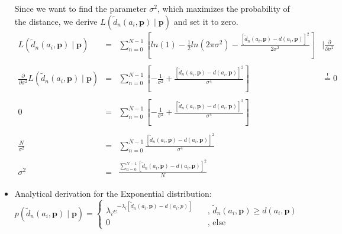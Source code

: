 \documentclass{article}
\begin{document}
\begin{itemize}
	    Since we want to find the parameter $\sigma^2$, which maximizes the probability of the distance, we derive $L(\tilde{d}_n(a_i,\mathbf{p})\mid\mathbf{p})$ and set it to zero. \\
	
	    $\begin{array}{cccr}
	        L(\tilde{d}_n(a_i,\mathbf{p})\mid\mathbf{p}) & = & \displaystyle \sum_{n=0}^{N-1} \left[ ln(1) - \frac{1}{2}ln(2\pi\sigma^2) - \frac{[\tilde{d}_n(a_i,\mathbf{p})-d(a_i,\mathbf{p})]^2}{2\sigma^2} \right] & \mid \frac{\partial}{\partial\sigma^2} \\\\
	        \frac{\partial}{\partial\sigma^2} L(\tilde{d}_n(a_i,\mathbf{p})\mid\mathbf{p}) & = & \displaystyle \sum_{n=0}^{N-1} \left[ - \frac{1}{\sigma^2} + \frac{[\tilde{d}_n(a_i,\mathbf{p})-d(a_i,\mathbf{p})]^2}{\sigma^4} \right] & \stackrel{!}{=} 0 \\\\
	        0 & = & \displaystyle \sum_{n=0}^{N-1} \left[ - \frac{1}{\sigma^2} + \frac{[\tilde{d}_n(a_i,\mathbf{p})-d(a_i,\mathbf{p})]^2}{\sigma^4} \right] & \\\\
	        \frac{N}{\sigma^2} & = & \displaystyle \sum_{n=0}^{N-1} \frac{[\tilde{d}_n(a_i,\mathbf{p})-d(a_i,\mathbf{p})]^2}{\sigma^4} \\\\
	        \sigma^2 & = & \frac{\displaystyle \sum_{n=0}^{N-1}[\tilde{d}_n(a_i,\mathbf{p})-d(a_i,\mathbf{p})]^2}{N} 
	    \end{array}$\\
         	 
	\item Analytical derivation for the Exponential distribution:\\
	 
	    \begin{equation*}
	  	     p(\tilde{d}_n(a_i,\mathbf{p})\mid\mathbf{p}) = 
	         \begin{cases}
	             \lambda_i e^{-\lambda_i [\tilde{d}_n(a_i,\mathbf{p}) - d(a_i,p)]} & \quad \text{, }\tilde{d}_n(a_i,\mathbf{p}) \geq d(a_i,\mathbf{p}) \\
	             0 & \quad \text{, else}
	         \end{cases}
	     \end{equation*}
	    

\end{itemize}
\end{document}
